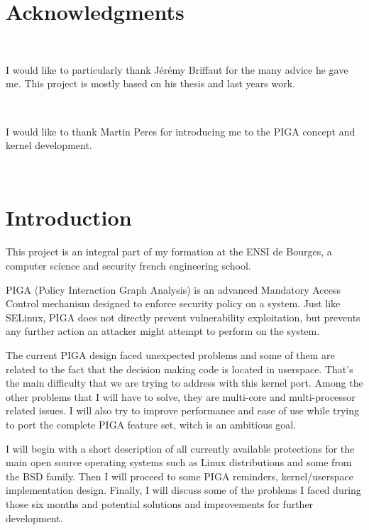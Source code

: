 \documentclass[pdftex,a4paper,titlepage,11pt]{article}
\begin{document}
\section*{Acknowledgments}

~

I would like to particularly thank Jérémy Briffaut for the many advice he gave me. This project is mostly based on his thesis and last years work.

~

I would like to thank Martin Peres for introducing me to the PIGA concept and kernel development.

~

\newpage

\tableofcontents

\newpage

\listoffigures

\newpage

\section*{Introduction} 

This project is an integral part of my formation at the ENSI de Bourges, a computer science and security french engineering school.

\bigskip

PIGA (Policy Interaction Graph Analysis) is an advanced Mandatory Access Control mechanism designed to enforce security policy on a system. Just like SELinux, PIGA does not directly prevent vulnerability exploitation, but prevents any further action an attacker might attempt to perform on the system.

\bigskip

The current PIGA design faced unexpected problems and some of them are related to the fact that the decision making code is located in userspace. That's the main difficulty that we are trying to address with this kernel port. Among the other problems that I will have to solve, they are multi-core and multi-processor related issues. I will also try to improve performance and ease of use while trying to port the complete PIGA feature set, witch is an ambitious goal.

\bigskip

I will begin with a short description of all currently available protections for the main open source operating systems such as Linux distributions and some from the BSD family. Then I will proceed to some PIGA reminders, kernel/userspace implementation design. Finally, I will discuss some of the problems I faced during those six months and potential solutions and improvements for further development.
\end{document}
